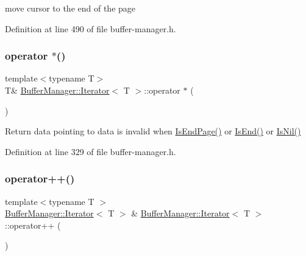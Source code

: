 move cursor to the end of the page 

Definition at line 490 of file buffer-\/manager.\+h.

\mbox{\label{class_buffer_manager_1_1_iterator_a633c54abf71a334ff179cc359e655d5d}} 
\subsubsection{\texorpdfstring{operator $\ast$()}{operator *()}}
{\footnotesize\ttfamily template$<$typename T$>$ \\
T\& \mbox{\hyperlink{class_buffer_manager_1_1_iterator}{Buffer\+Manager\+::\+Iterator}}$<$ T $>$\+::operator $\ast$ (\begin{DoxyParamCaption}{ }\end{DoxyParamCaption})\hspace{0.3cm}{\ttfamily [inline]}}

Return data pointing to data is invalid when {\ttfamily \mbox{\hyperlink{class_buffer_manager_1_1_iterator_a6afaceac9683f05d9e1ecfc9ff5f3a0f}{Is\+End\+Page()}}} or {\ttfamily \mbox{\hyperlink{class_buffer_manager_1_1_iterator_a02a38a84fd54e45d06818d2807b172d8}{Is\+End()}}} or {\ttfamily \mbox{\hyperlink{class_buffer_manager_1_1_iterator_ad19030c51bf30e6d6e9e2e560cc511c4}{Is\+Nil()}}} 

Definition at line 329 of file buffer-\/manager.\+h.

\mbox{\label{class_buffer_manager_1_1_iterator_aabf5af4d55b46c14bddff0e7caab3665}} 
\subsubsection{\texorpdfstring{operator++()}{operator++()}}
{\footnotesize\ttfamily template$<$typename T $>$ \\
\mbox{\hyperlink{class_buffer_manager_1_1_iterator}{Buffer\+Manager\+::\+Iterator}}$<$ T $>$ \& \mbox{\hyperlink{class_buffer_manager_1_1_iterator}{Buffer\+Manager\+::\+Iterator}}$<$ T $>$\+::operator++ (\begin{DoxyParamCaption}{ }\end{DoxyParamCaption})\hspace{0.3cm}{\ttfamily [inline]}}


